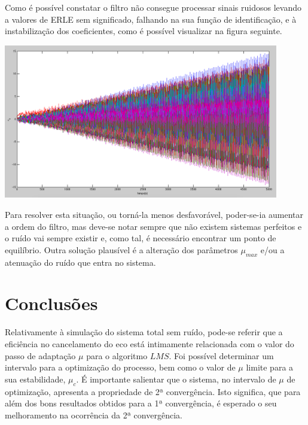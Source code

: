 \documentclass[a4paper,11pt]{report}
\begin{document}
Como é possível constatar o filtro não consegue processar sinais ruidosos levando a valores de ERLE sem significado, falhando na sua função de identificação, e à instabilização dos coeficientes, como é possível visualizar na figura seguinte.

\begin{center}
     \includegraphics[angle=0,width=0.9\textwidth]{c_k_G0_4_umax}
     \label{fig:SRucoeft}
\end{center}

Para resolver esta situação, ou torná-la menos desfavorável, poder-se-ia aumentar a ordem do filtro, mas deve-se notar sempre que não existem sistemas perfeitos e o ruído vai sempre existir e, como tal, é necessário encontrar um ponto de equilíbrio. Outra solução plausível é a alteração dos parâmetros $\mu_{max}$ e/ou a atenuação do ruído que entra no sistema.



\chapter{Conclusões}

Relativamente à simulação do sistema total sem ruído, pode-se referir que a eficiência no cancelamento do eco está intimamente relacionada com o valor do passo de adaptação $\mu$ para o algoritmo $LMS$. Foi possível determinar um intervalo para a optimização do processo, bem como o valor de $\mu$ limite para a sua estabilidade, $\mu_c$. É importante salientar que o sistema, no intervalo de $\mu$ de optimização, apresenta a propriedade de 2ª convergência. Isto significa, que para além dos bons resultados obtidos para a 1ª convergência, é esperado o seu melhoramento na ocorrência da 2ª convergência.\\
\end{document}
